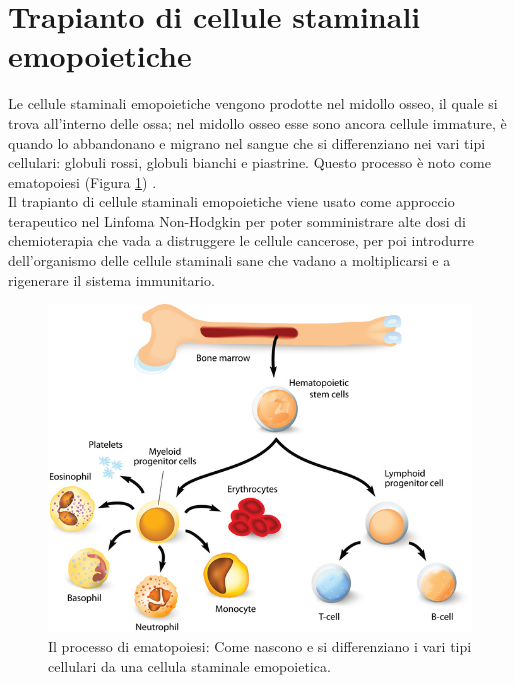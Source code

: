 \section{Trapianto di cellule staminali emopoietiche}

Le cellule staminali emopoietiche vengono prodotte nel midollo osseo, il quale si trova all’interno delle ossa; 
nel midollo osseo esse sono ancora cellule immature, è quando lo abbandonano e migrano nel sangue che si 
differenziano nei vari tipi cellulari: globuli rossi, globuli bianchi e piastrine. 
Questo processo è noto come ematopoiesi (Figura \ref{fig:FIGURE_3.14}) \cite{TRAPIANTO}.\\
Il trapianto di cellule staminali emopoietiche viene usato come approccio terapeutico nel Linfoma Non-Hodgkin per 
poter somministrare alte dosi di chemioterapia che vada a distruggere le cellule cancerose, per poi introdurre 
dell’organismo delle cellule staminali sane che vadano a moltiplicarsi e a rigenerare il sistema immunitario.

\begin{figure}[H]
    \begin{center}
    \includegraphics[width=0.5\columnwidth]{img/transplant.jpeg}
    \end{center}
    \caption{Il processo di ematopoiesi: Come nascono e si differenziano i 
    vari tipi cellulari da una cellula staminale emopoietica.
    \cite{img35}}
    \label{fig:FIGURE_3.14}
\end{figure}

